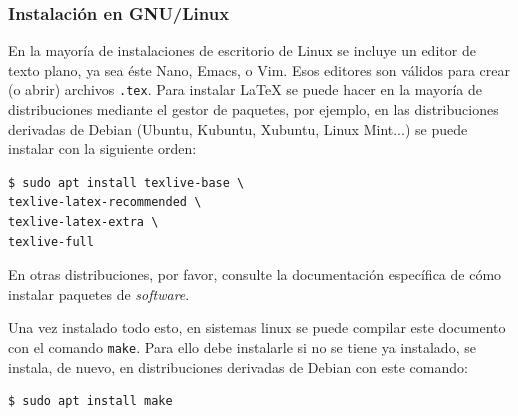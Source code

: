 \documentclass{article}
\begin{document}
\subsubsection{Instalación en GNU/Linux}
En la mayoría de instalaciones de escritorio de Linux se incluye un editor de
texto plano, ya sea éste Nano, Emacs, o Vim. Esos editores son válidos para
crear (o abrir) archivos \texttt{.tex}. Para instalar \LaTeX{} se puede hacer
en la mayoría de distribuciones mediante el gestor de paquetes, por ejemplo, en
las distribuciones derivadas de Debian (Ubuntu, Kubuntu, Xubuntu, Linux Mint...)
se puede instalar con la siguiente orden:
\begin{verbatim}
$ sudo apt install texlive-base \
texlive-latex-recommended \
texlive-latex-extra \
texlive-full
\end{verbatim} 
En otras distribuciones, 
por favor, consulte la documentación específica de cómo instalar paquetes de
\textit{software}.

Una vez instalado todo esto, en sistemas linux se puede compilar este 
documento con el comando \texttt{make}. Para ello debe instalarle si no se
tiene ya instalado, se instala, de nuevo, en distribuciones derivadas de Debian
con este comando: 
\begin{verbatim}
$ sudo apt install make
\end{verbatim}
\end{document}
